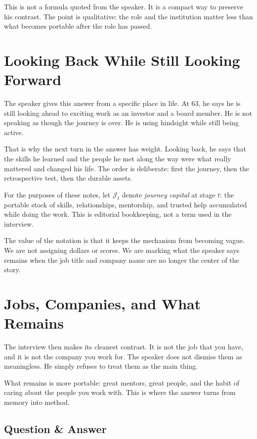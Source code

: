 This is not a formula quoted from the speaker. It is a compact way to preserve his contrast. The point is qualitative: the role and the institution matter less than what becomes portable after the role has passed.

\section{Looking Back While Still Looking Forward}

The speaker gives this answer from a specific place in life. At 63, he says he is still looking ahead to exciting work as an investor and a board member. He is not speaking as though the journey is over. He is using hindsight while still being active.

That is why the next turn in the answer has weight. Looking back, he says that the skills he learned and the people he met along the way were what really mattered and changed his life. The order is deliberate: first the journey, then the retrospective test, then the durable assets.

\begin{definition}
For the purposes of these notes, let \(\mathcal{J}_t\) denote \emph{journey capital} at stage \(t\): the portable stock of skills, relationships, mentorship, and trusted help accumulated while doing the work. This is editorial bookkeeping, not a term used in the interview.
\end{definition}

The value of the notation is that it keeps the mechanism from becoming vague. We are not assigning dollars or scores. We are marking what the speaker says remains when the job title and company name are no longer the center of the story.

\section{Jobs, Companies, and What Remains}

The interview then makes its cleanest contrast. It is not the job that you have, and it is not the company you work for. The speaker does not dismiss them as meaningless. He simply refuses to treat them as the main thing.

What remains is more portable: great mentors, great people, and the habit of caring about the people you work with. This is where the answer turns from memory into method.

\subsection{Question \& Answer}

